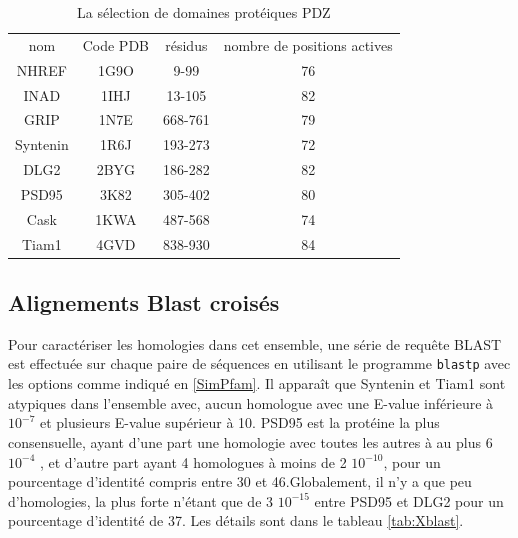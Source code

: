 \begin{table}[!htbp]
  \centering
  \caption{La sélection de domaines protéiques PDZ}
  \begin{tabular}{cccc}
    \toprule
    nom & Code PDB & résidus & nombre de positions actives\\
    \cmidrule{1-4}
    NHREF    & 1G9O  & 9-99    & 76 \\
    INAD     & 1IHJ  & 13-105  & 82 \\
    GRIP     & 1N7E  & 668-761 & 79 \\
    Syntenin & 1R6J  & 193-273 & 72 \\
    DLG2     & 2BYG  & 186-282 & 82 \\
    PSD95    & 3K82  & 305-402 & 80 \\
    Cask     & 1KWA  & 487-568 & 74 \\
    Tiam1    & 4GVD  & 838-930 & 84 \\
    \bottomrule
    
  \end{tabular}      
  \label{tab:protéines_PDZ}      
\end{table}

\subsection{Alignements Blast croisés}
   
Pour caractériser les homologies dans cet ensemble, une série de requête BLAST est effectuée sur chaque paire de séquences en utilisant le programme \verb!blastp! avec les options comme indiqué en \ref{SimPfam}. Il apparaît que Syntenin et Tiam1 sont atypiques dans l'ensemble avec, aucun homologue avec une E-value inférieure à $10^{-7}$ et plusieurs E-value supérieur à 10. PSD95 est la protéine la plus consensuelle, ayant d'une part une homologie avec toutes les autres à au plus 6 $10^{-4}$ , et d'autre part ayant 4 homologues à moins de 2 $10^{-10}$, pour un pourcentage d'identité compris entre 30 et 46.Globalement, il n'y a que peu d'homologies, la plus forte n'étant que de 3 $10^{-15}$ entre PSD95 et DLG2 pour un pourcentage d'identité de 37. Les détails sont dans le tableau \ref{tab:Xblast}.



